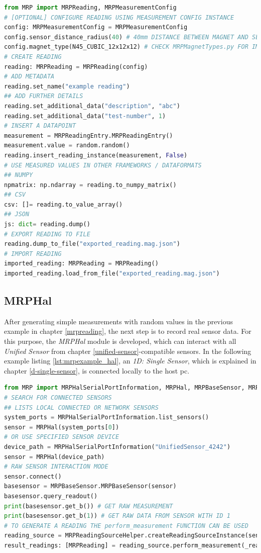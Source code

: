 \begin{lstlisting}[language=Python, caption={MRPReading example for setting up a basic measurement using Python code}, label=lst:mrpexample_reading]
from MRP import MRPReading, MRPMeasurementConfig
# [OPTIONAL] CONFIGURE READING USING MEASUREMENT CONFIG INSTANCE
config: MRPMeasurementConfig = MRPMeasurementConfig
config.sensor_distance_radius(40) # 40mm DISTANCE BETWEEN MAGNET AND SENSOR
config.magnet_type(N45_CUBIC_12x12x12) # CHECK MRPMagnetTypes.py FOR IMPLEMENTED TYPES
# CREATE READING
reading: MRPReading = MRPReading(config)
# ADD METADATA
reading.set_name("example reading")
## ADD FURTHER DETAILS
reading.set_additional_data("description", "abc")
reading.set_additional_data("test-number", 1)
# INSERT A DATAPOINT
measurement = MRPReadingEntry.MRPReadingEntry()
measurement.value = random.random()
reading.insert_reading_instance(measurement, False)
# USE MEASURED VALUES IN OTHER FRAMEWORKS / DATAFORMATS
## NUMPY
npmatrix: np.ndarray = reading.to_numpy_matrix()
## CSV
csv: []= reading.to_value_array()
## JSON
js: dict= reading.dump()
# EXPORT READING TO FILE
reading.dump_to_file("exported_reading.mag.json")
# IMPORT READING
imported_reading: MRPReading = MRPReading()
imported_reading.load_from_file("exported_reading.mag.json")
\end{lstlisting}

\hypertarget{mrphal}{%
\subsection{MRPHal}\label{mrphal}}

After generating simple measurements with random values in the previous
example in chapter \ref{mrpreading}, the next step is to record real
sensor data. For this purpose, the \emph{MRPHal} module is developed,
which can interact with all \emph{Unified Sensor} from chapter
\ref{unified-sensor}-compatible sensors. In the following example
listing \ref{lst:mrpexample_hal}, an \emph{1D: Single Sensor}, which is
explained in chapter \ref{d-single-sensor}, is connected locally to the
host \gls{pc}.

\newpage

\begin{lstlisting}[language=Python, caption={MRPHal example to use a connected hardware sensor to store raw sensor readings inside a measurement}, label=lst:mrpexample_hal]
from MRP import MRPHalSerialPortInformation, MRPHal, MRPBaseSensor, MRPReadingSource
# SEARCH FOR CONNECTED SENSORS
## LISTS LOCAL CONNECTED OR NETWORK SENSORS
system_ports = MRPHalSerialPortInformation.list_sensors()
sensor = MRPHal(system_ports[0])
# OR USE SPECIFIED SENSOR DEVICE
device_path = MRPHalSerialPortInformation("UnifiedSensor_4242")
sensor = MRPHal(device_path)
# RAW SENSOR INTERACTION MODE
sensor.connect()
basesensor = MRPBaseSensor.MRPBaseSensor(sensor)
basesensor.query_readout()
print(basesensor.get_b()) # GET RAW MEASUREMENT
print(basesensor.get_b(1)) # GET RAW DATA FROM SENSOR WITH ID 1
# TO GENERATE A READING THE perform_measurement FUNCTION CAN BE USED
reading_source = MRPReadingSourceHelper.createReadingSourceInstance(sensor)
result_readings: [MRPReading] = reading_source.perform_measurement(_readings=1, _hwavg=1)
\end{lstlisting}

